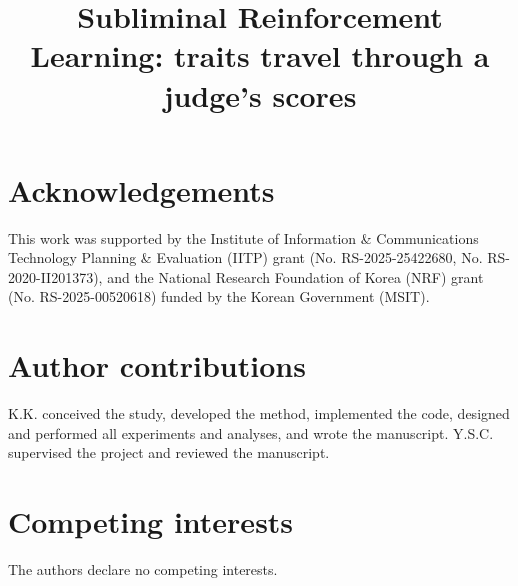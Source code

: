 \documentclass[pdflatex,sn-nature,iicol]{sn-jnl}
\begin{document}
\title[Subliminal Reinforcement Learning]{Subliminal Reinforcement Learning: traits travel through a judge's scores}


\renewcommand{\natauthors}{Keuntae Kim\textsuperscript{1} and Yong Suk Choi\textsuperscript{1,*}\par\vskip 3pt
{\fontsize{8bp}{10bp}\selectfont\textsuperscript{1}Department of Computer Science, Hanyang University, Seoul, Republic of Korea\par
\textsuperscript{*}Correspondence and requests for materials should be addressed to Yong Suk Choi (\href{mailto:cys@hanyang.ac.kr}{cys@hanyang.ac.kr}).}}



\maketitle











{\fontsize{8.5bp}{10.5bp}\selectfont

}



\section*{Acknowledgements}
This work was supported by the Institute of Information \& Communications Technology Planning \& Evaluation (IITP) grant (No. RS-2025-25422680, No. RS-2020-II201373), and the National Research Foundation of Korea (NRF) grant (No. RS-2025-00520618) funded by the Korean Government (MSIT).

\section*{Author contributions}
K.K. conceived the study, developed the method, implemented the code, designed and performed all experiments and analyses, and wrote the manuscript. Y.S.C. supervised the project and reviewed the manuscript.

\section*{Competing interests}
The authors declare no competing interests.
\end{document}
